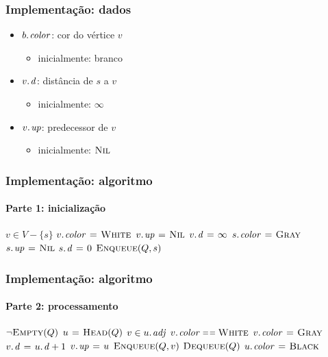 \documentclass{beamer}
\begin{document}
\begin{frame}
\frametitle{Implementação: dados}

\begin{itemize}
\item $\attrib{b}{color}$: cor do vértice $v$
\begin{itemize}
\item inicialmente: branco
\end{itemize}
\item $\attrib{v}{d}$: distância de $s$ a $v$ 
\begin{itemize}
\item inicialmente: $\infty$
\end{itemize}
\item $\attrib{v}{up}$: predecessor de $v$ 
\begin{itemize}
\item inicialmente: $\textnormal{\scshape Nil}$
\end{itemize}
\end{itemize}
\end{frame}

\begin{frame}
\frametitle{Implementação: algoritmo}
\framesubtitle{Parte 1: inicialização}

\begin{codebox}
\zi {}
\zi \For $v \in V - \{ s \}$ 
\zi \Do $\attrib{v}{color} \gets \const{White}$
\zi   $\attrib{v}{up} \gets \const{Nil}$
\zi   $\attrib{v}{d} \gets \infty$
\zi \End
\zi $\attrib{s}{color} \gets \const{Gray}$
\zi $\attrib{s}{up} \gets \const{Nil}$
\zi $\attrib{s}{d} \gets 0$
\zi $\textnormal{\scshape Enqueue}(Q, s)$
\end{codebox}
\end{frame}

\begin{frame}
\frametitle{Implementação: algoritmo}
\framesubtitle{Parte 2: processamento}

\begin{codebox}
\zi {}
\zi \While $\neg \textnormal{\scshape Empty}(Q)$
\zi \Do $u \mathrel{\hspace{1pt}=\hspace{1pt}} \textnormal{\scshape Head}(Q)$
\zi   \For $v \in \attrib{u}{adj}$
\zi   \Do \If $\attrib{v}{color} \isequal \const{White}$
\zi     \Then $\attrib{v}{color} \gets \const{Gray}$
\zi       $\attrib{v}{d} \gets \attrib{u}{d}+1$
\zi       $\attrib{v}{up} \gets u$
\zi       $\textnormal{\scshape Enqueue}(Q, v)$
     \End
   \End
\zi   $\textnormal{\scshape Dequeue}(Q)$
\zi   $\attrib{u}{color} \gets \const{Black}$
\zi \End
\end{codebox}
\end{frame}
\end{document}

